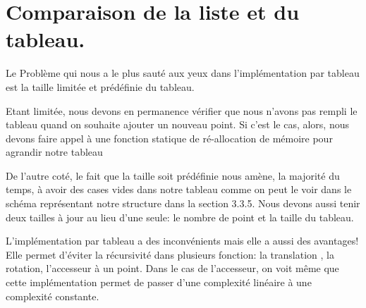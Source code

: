 \documentclass[a4paper, 11pt, oneside]{article}
\begin{document}
\section{Comparaison de la liste et du tableau.}

Le Problème qui nous a le plus sauté aux yeux dans l'implémentation par tableau est la taille limitée et prédéfinie du tableau. 

Etant limitée, nous devons en permanence vérifier que nous n'avons pas rempli le tableau quand on souhaite ajouter un nouveau point. Si c'est le cas, alors, nous devons faire appel à une fonction statique de ré-allocation de mémoire pour agrandir notre tableau

De l'autre coté, le fait que la taille soit prédéfinie nous amène, la majorité du temps, à avoir des cases vides dans notre tableau comme on peut le voir dans le schéma représentant notre structure dans la section 3.3.5. Nous devons aussi tenir deux tailles à jour au lieu d'une seule: le nombre de point et la taille du tableau.

L'implémentation par tableau a des inconvénients mais elle a aussi des avantages! Elle permet d'éviter la récursivité dans plusieurs fonction: la translation , la rotation, l'accesseur à un point. Dans le cas de l'accesseur, on voit même que cette implémentation permet de passer d'une complexité linéaire à une complexité constante.
\end{document}
